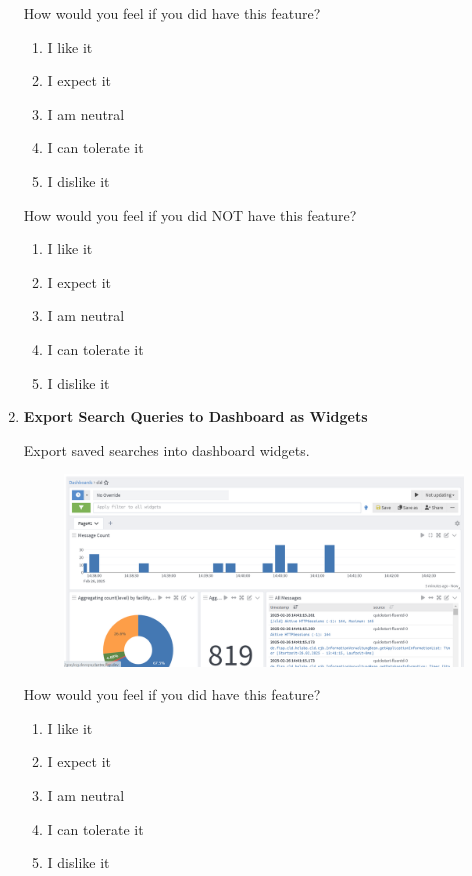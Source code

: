 \documentclass[../main.tex]{subfiles}
\begin{document}
\begin{enumerate}
    How would you feel if you did have this feature?
    \begin{enumerate}
        \item I like it
        \item I expect it
        \item  I am neutral
        \item I can tolerate it
        \item I dislike it
    \end{enumerate}

    How would you feel if you did NOT have this feature?
    \begin{enumerate}
        \item I like it
        \item I expect it
        \item  I am neutral
        \item I can tolerate it
        \item I dislike it
    \end{enumerate}

    \clearpage
    \item\textbf{Export Search Queries to Dashboard as Widgets}
    
    Export saved searches into dashboard widgets.

    \begin{figure}[H]
        \centering
        \includegraphics[scale=0.3]{img/10-appendix/dashboard.png}
        \label{fig:dashboard}
    \end{figure}

    How would you feel if you did have this feature?
    \begin{enumerate}
        \item I like it
        \item I expect it
        \item  I am neutral
        \item I can tolerate it
        \item I dislike it
    \end{enumerate}


\end{enumerate}
\end{document}
